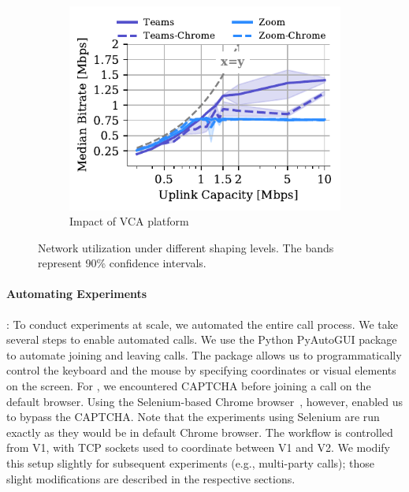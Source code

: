 \begin{figure}[t!]
\begin{subfigure}[t]{0.33\textwidth}
    \includegraphics[width=\textwidth,keepaspectratio]{figures/static/uplink_browser.pdf}
    \caption{Impact of VCA platform}
	\label{subfig:uplink_browser}
\end{subfigure} 
\vspace{-1em}
\caption{Network utilization under different shaping levels. The bands represent 90\% confidence intervals.}
\label{fig:static}
\end{figure}


\paragraph{Automating Experiments}: To conduct experiments at scale, we
automated the entire call process. We take several steps to enable automated calls.  We use the Python PyAutoGUI package~\cite{pyautogui} to
automate joining and leaving calls. The package allows us to programmatically
control the keyboard and the mouse by specifying coordinates or visual
elements on the screen. For \zoombrowser, we encountered CAPTCHA before
joining a call on the default browser. Using the Selenium-based Chrome
browser~\cite{selenium}, however, enabled us to bypass the CAPTCHA. Note that the
experiments using Selenium are run exactly as they would be in default Chrome
browser. The workflow is controlled from V1, with TCP sockets used to
coordinate between V1 and V2.  We modify this setup slightly for subsequent
experiments (e.g., multi-party calls); those slight modifications are
described in the respective sections.






